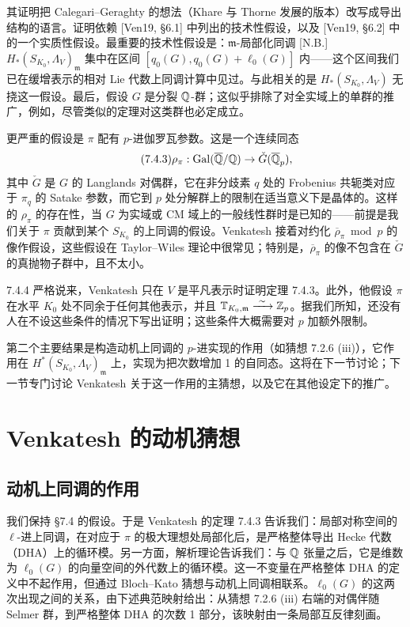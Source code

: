 其证明把 Calegari--Geraghty 的想法（Khare 与 Thorne 发展的版本）改写成导出结构的语言。证明依赖 [Ven19, §6.1] 中列出的技术性假设，以及 [Ven19, §6.2] 中的一个实质性假设。最重要的技术性假设是：$\mathfrak m$-局部化同调 [N.B.] $H_*(S_{K_0},\Lambda_V)_{\mathfrak m}$ 集中在区间 $[q_0(G),q_0(G)+\ell_0(G)]$ 内——这个区间我们已在缓增表示的相对 Lie 代数上同调计算中见过。与此相关的是 $H_*(S_{K_0},\Lambda_V)$ 无挠这一假设。最后，假设 $G$ 是分裂 $\mathbb{Q}$-群；这似乎排除了对全实域上的单群的推广，例如，尽管类似的定理对这类群也必定成立。

更严重的假设是 $\pi$ 配有 $p$-进伽罗瓦参数。这是一个连续同态
\begin{equation}\tag{7.4.3}\label{eq:a6-05-6}
\rho_\pi:\operatorname{Gal}(\overline{\mathbb{Q}}/\mathbb{Q})\to\check G(\overline{\mathbb{Q}}_p),
\end{equation}
其中 $\check G$ 是 $G$ 的 Langlands 对偶群，它在非分歧素 $q$ 处的 Frobenius 共轭类对应于 $\pi_q$ 的 Satake 参数，而它到 $p$ 处分解群上的限制在适当意义下是晶体的。这样的 $\rho_\pi$ 的存在性，当 $G$ 为实域或 CM 域上的一般线性群时是已知的——前提是我们关于 $\pi$ 贡献到某个 $S_{K_0}$ 的上同调的假设。Venkatesh 接着对约化 $\overline{\rho}_\pi\bmod p$ 的像作假设，这些假设在 Taylor--Wiles 理论中很常见；特别是，$\overline{\rho}_\pi$ 的像不包含在 $\check G$ 的真抛物子群中，且不太小。

\begin{rem}{7.4.4}\label{thm:a6-05-8}
严格说来，Venkatesh 只在 $V$ 是平凡表示时证明定理 7.4.3。此外，他假设 $\pi$ 在水平 $K_0$ 处不同余于任何其他表示，并且 $\mathbb T_{K_0,\mathfrak m}\xrightarrow{\ \sim\ }\mathbb{Z}_p$。据我们所知，还没有人在不设这些条件的情况下写出证明；这些条件大概需要对 $p$ 加额外限制。
\end{rem}

第二个主要结果是构造动机上同调的 $p$-进实现的作用（如猜想 7.2.6 (iii)），它作用在 $H^*(S_{K_0},\Lambda_V)_{\mathfrak m}$ 上，实现为把次数增加 1 的自同态。这将在下一节讨论；下一节专门讨论 Venkatesh 关于这一作用的主猜想，以及它在其他设定下的推广。

\section{Venkatesh 的动机猜想}

\subsection{动机上同调的作用}

我们保持 §7.4 的假设。于是 Venkatesh 的定理 7.4.3 告诉我们：局部对称空间的 $\ell$-进上同调，在对应于 $\pi$ 的极大理想处局部化后，是严格整体导出 Hecke 代数（DHA）上的循环模。另一方面，解析理论告诉我们：与 $\mathbb{Q}$ 张量之后，它是维数为 $\ell_0(G)$ 的向量空间的外代数上的循环模。这一不变量在严格整体 DHA 的定义中不起作用，但通过 Bloch--Kato 猜想与动机上同调相联系。$\ell_0(G)$ 的这两次出现之间的关系，由下述典范映射给出：从猜想 7.2.6 (iii) 右端的对偶伴随 Selmer 群，到严格整体 DHA 的次数 1 部分，该映射由一条局部互反律刻画。

